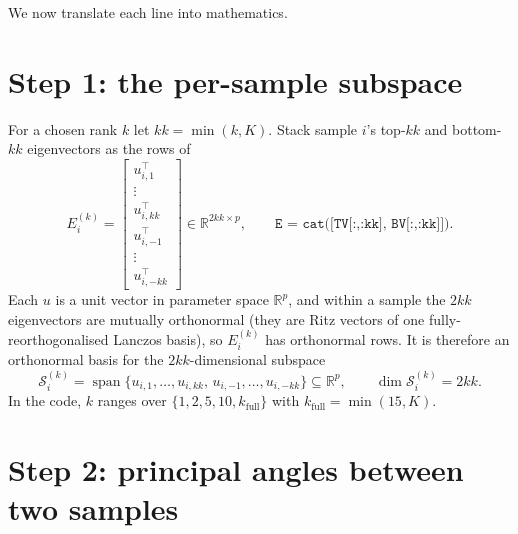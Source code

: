 \documentclass[11pt]{article}
\newcommand{\R}{\mathbb{R}}
\newcommand{\Sub}[1]{\mathcal{S}_{#1}}
\begin{document}
We now translate each line into mathematics.

\section{Step 1: the per-sample subspace}

For a chosen rank $k$ let $kk=\min(k,K)$. Stack sample $i$'s top-$kk$ and bottom-$kk$
eigenvectors as the rows of
\begin{equation}
  E_i^{(k)}=
  \begin{bmatrix}
    u_{i,1}^{\top}\\ \vdots\\ u_{i,kk}^{\top}\\
    u_{i,-1}^{\top}\\ \vdots\\ u_{i,-kk}^{\top}
  \end{bmatrix}\in\R^{2kk\times p},
  \qquad
  \texttt{E = cat([TV[:,:kk], BV[:,:kk]])}.
\end{equation}
Each $u$ is a unit vector in parameter space $\R^p$, and within a sample the $2kk$
eigenvectors are mutually orthonormal (they are Ritz vectors of one
fully-reorthogonalised Lanczos basis), so $E_i^{(k)}$ has orthonormal rows. It is
therefore an orthonormal basis for the $2kk$-dimensional subspace
\begin{equation}
  \Sub{i}^{(k)}
  =\operatorname{span}\bigl\{u_{i,1},\dots,u_{i,kk},\,u_{i,-1},\dots,u_{i,-kk}\bigr\}
  \subseteq\R^{p},
  \qquad \dim \Sub{i}^{(k)}=2kk .
\end{equation}
In the code, $k$ ranges over $\{1,2,5,10,k_{\mathrm{full}}\}$ with
$k_{\mathrm{full}}=\min(15,K)$.

\section{Step 2: principal angles between two samples}
\end{document}
